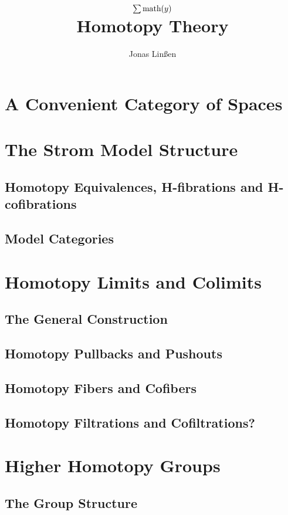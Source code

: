 

\title{
	$\sum \text{math}(y)$\\
	Homotopy Theory
}
\author{Jonas Linßen}


	\maketitle
	\tableofcontents

	\newpage
	\section{A Convenient Category of Spaces}
	\section{The Strom Model Structure}
	\subsection{Homotopy Equivalences, H-fibrations and H-cofibrations}
	\subsection{Model Categories}

	\newpage
	\section{Homotopy Limits and Colimits}
	\subsection{The General Construction}
	\subsection{Homotopy Pullbacks and Pushouts}
	\subsection{Homotopy Fibers and Cofibers}
	\subsection{Homotopy Filtrations and Cofiltrations?}

	\newpage
	\section{Higher Homotopy Groups}
	\subsection{The Group Structure}
